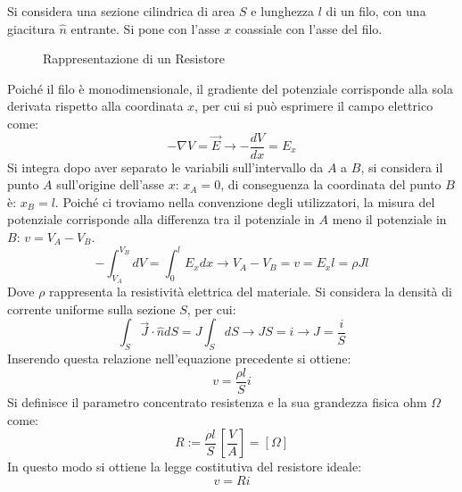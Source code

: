 \documentclass{article}
\numberwithin{equation}{subsection}
\begin{document}
Si considera una sezione cilindrica di area $S$ e lunghezza $l$ di un filo, con una giacitura $\hat{n}$ entrante. Si pone con l'asse $x$ coassiale con l'asse del filo. 

\begin{figure}[H]%
    \centering
    \qquad
    \caption{Rappresentazione di un Resistore}
    \label{fig:rappresentazione-resistore}
\end{figure}

Poiché il filo è monodimensionale, il gradiente del potenziale corrisponde alla sola derivata rispetto alla coordinata $x$, per cui si può esprimere il campo elettrico come:
\begin{equation*}
    -\nabla V=\vec{E}\to\displaystyle-\frac{dV}{dx}=E_x
\end{equation*}
Si integra dopo aver separato le variabili sull'intervallo da $A$ a $B$, si considera il punto $A$ sull'origine dell'asse $x$: $x_A=0$, di conseguenza la coordinata del punto 
$B$ è: $x_B=l$. Poiché ci troviamo nella convenzione degli utilizzatori, la misura del potenziale corrisponde alla differenza tra il potenziale in $A$ meno il potenziale in $B$:
$v=V_A-V_B$. 
\begin{equation*}
    \displaystyle-\int_{V_A}^{V_B}dV=\int_0^lE_xdx\to V_A-V_B=v=E_xl=\rho Jl
\end{equation*}
Dove $\rho$ rappresenta la resistività elettrica del materiale. Si considera la densità di corrente uniforme sulla sezione $S$, per cui:
\begin{equation*}
    \displaystyle\int_S\vec{J}\cdot\hat{n}dS=J\int_SdS\to JS=i\to J=\frac{i}{S}
\end{equation*}
Inserendo questa relazione nell'equazione precedente si ottiene:
\begin{equation*}
    v=\displaystyle\frac{\rho l}{S}i
\end{equation*}
Si definisce il parametro concentrato resistenza e la sua grandezza fisica ohm $\Omega$ come:
\begin{equation*}
    R:=\displaystyle\frac{\rho  l}{S}\,\left[\frac{V}{A}\right]=[\Omega]
\end{equation*}
In questo modo si ottiene la legge costitutiva del resistore ideale:
\begin{equation}
    v=Ri
\end{equation}
\end{document}

